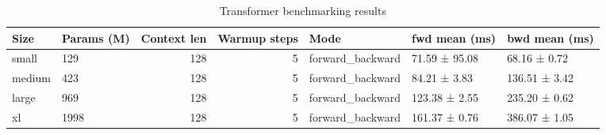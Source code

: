\begin{table}
\caption{Transformer benchmarking results}
\label{tab:benchmarks}
\begin{tabular}{llrrlll}
\toprule
Size & Params (M) & Context len & Warmup steps & Mode & fwd mean (ms) & bwd mean (ms) \\
\midrule
small & 129 & 128 & 5 & forward_backward & 71.59 ± 95.08 & 68.16 ± 0.72 \\
medium & 423 & 128 & 5 & forward_backward & 84.21 ± 3.83 & 136.51 ± 3.42 \\
large & 969 & 128 & 5 & forward_backward & 123.38 ± 2.55 & 235.20 ± 0.62 \\
xl & 1998 & 128 & 5 & forward_backward & 161.37 ± 0.76 & 386.07 ± 1.05 \\
\bottomrule
\end{tabular}
\end{table}
